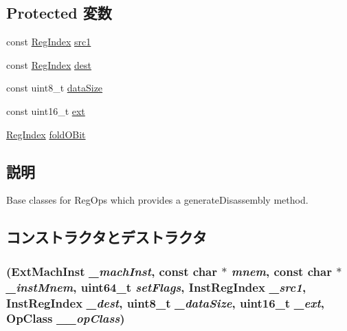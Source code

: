 \subsection*{Protected 変数}
\begin{DoxyCompactItemize}
\item 
const \hyperlink{classStaticInst_a36d25e03e43fa3bb4c5482cbefe5e0fb}{RegIndex} \hyperlink{classX86ISA_1_1RegOpBase_ac0ec0327e65bf2376ccab1d826a7094e}{src1}
\item 
const \hyperlink{classStaticInst_a36d25e03e43fa3bb4c5482cbefe5e0fb}{RegIndex} \hyperlink{classX86ISA_1_1RegOpBase_ab74217a19b7ae8f204175991a8087f1e}{dest}
\item 
const uint8\_\-t \hyperlink{classX86ISA_1_1RegOpBase_a107c258b340f17c2bfd8326ada8441ce}{dataSize}
\item 
const uint16\_\-t \hyperlink{classX86ISA_1_1RegOpBase_a389186ffbf742eed7830fbe38d05f08c}{ext}
\item 
\hyperlink{classStaticInst_a36d25e03e43fa3bb4c5482cbefe5e0fb}{RegIndex} \hyperlink{classX86ISA_1_1RegOpBase_a90c82d522b8ec23488d1dab400eb43d8}{foldOBit}
\end{DoxyCompactItemize}


\subsection{説明}
Base classes for RegOps which provides a generateDisassembly method. 

\subsection{コンストラクタとデストラクタ}
\hypertarget{classX86ISA_1_1RegOpBase_ad7c88ff8f34220cd01fb7989aa8ddd11}{
\subsubsection[{RegOpBase}]{ ({\bf ExtMachInst} {\em \_\-machInst}, \/  const char $\ast$ {\em mnem}, \/  const char $\ast$ {\em \_\-instMnem}, \/  uint64\_\-t {\em setFlags}, \/  {\bf InstRegIndex} {\em \_\-src1}, \/  {\bf InstRegIndex} {\em \_\-dest}, \/  uint8\_\-t {\em \_\-dataSize}, \/  uint16\_\-t {\em \_\-ext}, \/  OpClass {\em \_\-\_\-opClass})}}
\label{classX86ISA_1_1RegOpBase_ad7c88ff8f34220cd01fb7989aa8ddd11}




